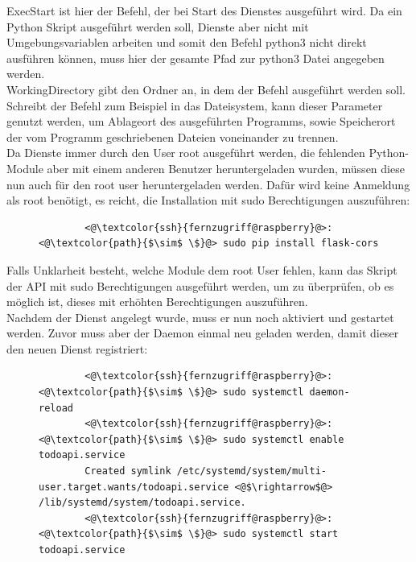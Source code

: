 \documentclass[a4paper, 12pt]{scrartcl}
\begin{document}
ExecStart ist hier der Befehl, der bei Start des Dienstes ausgeführt wird. Da ein Python Skript ausgeführt werden soll,
Dienste aber nicht mit Umgebungsvariablen arbeiten und somit den Befehl python3 nicht direkt ausführen können, muss hier
der gesamte Pfad zur python3 Datei angegeben werden.
\\
WorkingDirectory gibt den Ordner an, in dem der Befehl ausgeführt werden soll. Schreibt der Befehl zum Beispiel in das Dateisystem,
kann dieser Parameter genutzt werden, um Ablageort des ausgeführten Programms, sowie Speicherort der vom Programm geschriebenen
Dateien voneinander zu trennen.
\\
Da Dienste immer durch den User \glqq root\grqq{} ausgeführt werden, die fehlenden Python-Module aber mit einem anderen
Benutzer heruntergeladen wurden, müssen diese nun auch für den root user heruntergeladen werden. Dafür wird keine Anmeldung
als root benötigt, es reicht, die Installation mit sudo Berechtigungen auszuführen:
\begin{figure}[H]
    \begin{mdframed}[backgroundcolor=bbg]
        \begin{lstlisting}
        <@\textcolor{ssh}{fernzugriff@raspberry}@>:<@\textcolor{path}{$\sim$ \$}@> sudo pip install flask-cors
        \end{lstlisting}
    \end{mdframed}
    \label{lst:install_python_mods_sudo}
\end{figure}
Falls Unklarheit besteht, welche Module dem root User fehlen, kann das Skript der API mit sudo Berechtigungen ausgeführt werden, um zu überprüfen,
ob es möglich ist, dieses mit erhöhten Berechtigungen auszuführen.
\\
Nachdem der Dienst angelegt wurde, muss er nun noch aktiviert und gestartet werden. Zuvor muss aber der Daemon einmal neu geladen werden, damit dieser den neuen Dienst
registriert:
\begin{figure}[H]
    \begin{mdframed}[backgroundcolor=bbg]
        \begin{lstlisting}
        <@\textcolor{ssh}{fernzugriff@raspberry}@>:<@\textcolor{path}{$\sim$ \$}@> sudo systemctl daemon-reload
        <@\textcolor{ssh}{fernzugriff@raspberry}@>:<@\textcolor{path}{$\sim$ \$}@> sudo systemctl enable todoapi.service
        Created symlink /etc/systemd/system/multi-user.target.wants/todoapi.service <@$\rightarrow$@> /lib/systemd/system/todoapi.service.
        <@\textcolor{ssh}{fernzugriff@raspberry}@>:<@\textcolor{path}{$\sim$ \$}@> sudo systemctl start todoapi.service
        \end{lstlisting}
    \end{mdframed}
    \label{lst:enable_service}
\end{figure}
\end{document}
